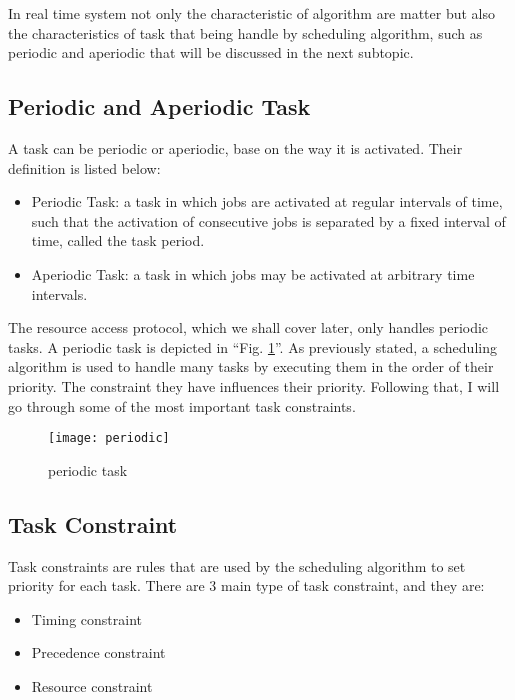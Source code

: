 In real time system not only the characteristic of algorithm are matter but also the characteristics  of task that being handle by scheduling algorithm, such as periodic and aperiodic that will be discussed in the next subtopic.

\subsection{Periodic and Aperiodic Task}

A task can be periodic or aperiodic, base on the way it is activated. Their definition is listed below:
\begin{itemize}
\item Periodic Task: a task in which jobs are activated at regular intervals of time, such that the activation of consecutive jobs is separated by a fixed interval of time, called the task period\cite{b4}.
\item Aperiodic Task: a task in which jobs may be activated at arbitrary time intervals\cite{b4}.
\end{itemize}

The resource access protocol, which we shall cover later, only handles periodic tasks. A periodic task is depicted in ``Fig. \ref{fig:periodic}''. As previously stated, a scheduling algorithm is used to handle many tasks by executing them in the order of their priority. The constraint they have influences their priority. Following that, I will go through some of the most important task constraints.

\begin{figure}[ht]
    \centering
    \texttt{[image: periodic]}
    \caption{periodic task \cite{b5}}
    \label{fig:periodic}
\end{figure}

\subsection{Task Constraint}

Task constraints are rules that are used by the scheduling algorithm to set  priority for each task. There are 3 main type of task constraint, and they are:

\begin{itemize}
\item Timing constraint
\item Precedence constraint
\item Resource constraint
\end{itemize}

